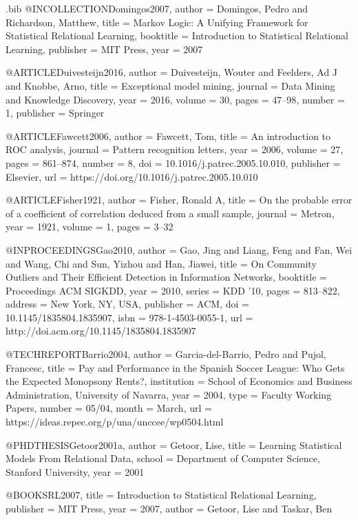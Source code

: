 {\begin{filecontents}{\jobname.bib}
@INCOLLECTION{Domingos2007,
  author = {Domingos, Pedro and Richardson, Matthew},
  title = {{Markov} Logic: A Unifying Framework for Statistical Relational Learning},
  booktitle = {Introduction to Statistical Relational Learning},
  publisher = {MIT Press},
  year = {2007}
}

@ARTICLE{Duivesteijn2016,
  author = {Duivesteijn, Wouter and Feelders, Ad J and Knobbe, Arno},
  title = {{Exceptional model mining}},
  journal = {Data Mining and Knowledge Discovery},
  year = {2016},
  volume = {30},
  pages = {47--98},
  number = {1},
  publisher = {Springer}
}

@ARTICLE{Fawcett2006,
  author = {Fawcett, Tom},
  title = {{An introduction to ROC analysis}},
  journal = {Pattern recognition letters},
  year = {2006},
  volume = {27},
  pages = {861--874},
  number = {8},
  doi = {10.1016/j.patrec.2005.10.010},
  publisher = {Elsevier},
  url = {https://doi.org/10.1016/j.patrec.2005.10.010}
}

@ARTICLE{Fisher1921,
  author = {Fisher, Ronald A},
  title = {{On the probable error of a coefficient of correlation deduced from a
	small sample}},
  journal = {Metron},
  year = {1921},
  volume = {1},
  pages = {3--32}
}

@INPROCEEDINGS{Gao2010,
  author = {Gao, Jing and Liang, Feng and Fan, Wei and Wang, Chi and Sun, Yizhou
	and Han, Jiawei},
  title = {On Community Outliers and Their Efficient Detection in Information
	Networks},
  booktitle = {Proceedings ACM SIGKDD},
  year = {2010},
  series = {KDD '10},
  pages = {813--822},
  address = {New York, NY, USA},
  publisher = {ACM},
  doi = {10.1145/1835804.1835907},
  isbn = {978-1-4503-0055-1},
  url = {http://doi.acm.org/10.1145/1835804.1835907}
}

@TECHREPORT{Barrio2004,
  author = {Garcia-del-Barrio, Pedro and Pujol, Francesc},
  title = {Pay and Performance in the Spanish Soccer League: Who Gets the Expected
	Monopsony Rents?},
  institution = {School of Economics and Business Administration, University of Navarra},
  year = {2004},
  type = {Faculty Working Papers},
  number = {05/04},
  month = {March},
  url = {https://ideas.repec.org/p/una/unccee/wp0504.html}
}

@PHDTHESIS{Getoor2001a,
  author = {Getoor, Lise},
  title = {{Learning Statistical Models From Relational Data}},
  school = {Department of Computer Science, Stanford University},
  year = {2001}
}

@BOOK{SRL2007,
  title = {{Introduction to Statistical Relational Learning}},
  publisher = {MIT Press},
  year = {2007},
  author = {Getoor, Lise and Taskar, Ben}
}


\end{filecontents}}
